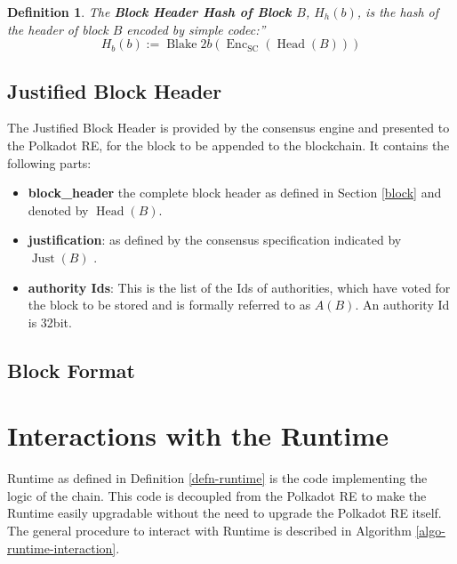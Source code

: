 \documentclass{article}
\newcommand{\assign}{:=}
\newcommand{\tmop}[1]{\ensuremath{\operatorname{#1}}}
\newcommand{\tmsamp}[1]{\textsf{#1}}
\newcommand{\tmstrong}[1]{\textbf{#1}}
\newcommand{\tmtextbf}[1]{{\bfseries{#1}}}
\newcommand{\tmtextsf}[1]{{\sffamily{#1}}}
\newtheorem{definition}{Definition}
\providecommand{\tmop}[1]{\ensuremath{\mathrm{#1}}}
\providecommand{\tmsamp}[1]{\tmtextsf{#1}}
\providecommand{\tmstrong}[1]{\tmtextbf{#1}}
\providecommand{\tmtextbf}[1]{\tmtextbf{#1}}
\newtheorem{definition}{Definition}
\begin{document}
\begin{definition}
  \label{defn-block-header-hash}The {\tmstrong{Block Header Hash of Block
  $B$}}, {\tmstrong{$H_h (b)$}}, is the hash of the header of block $B$
  encoded by simple codec:''
  \[ H_b (b) \assign \tmop{Blake} 2 b (\tmop{Enc}_{\tmop{SC}} (\tmop{Head}
     (B))) \]
\end{definition}

\subsection{Justified Block Header}

The Justified Block Header is provided by the consensus engine and presented
to the Polkadot RE, for the block to be appended to the blockchain. It
contains the following parts:
\begin{itemize}
  \item {\tmstrong{{\tmsamp{{\tmstrong{block\_header}}}}}} the complete block
  header as defined in Section \ref{block} and denoted by $\tmop{Head} (B)$.
  
  \item {\tmstrong{{\tmsamp{justification}}}}: as defined by the consensus
  specification indicated by $\tmop{Just} (B)$ {}.
  
  \item {\tmstrong{{\tmsamp{authority Ids}}}}: This is the list of the Ids of
  authorities, which have voted for the block to be stored and is formally
  referred to as $A (B)$. An authority Id is 32bit.
\end{itemize}

\subsection{Block Format}

\section{Interactions with the Runtime}\label{sect-entries-into-runtime}

Runtime as defined in Definition \ref{defn-runtime} is the code implementing
the logic of the chain. This code is decoupled from the Polkadot RE to make
the Runtime easily upgradable without the need to upgrade the Polkadot RE
itself. The general procedure to interact with Runtime is described in
Algorithm \ref{algo-runtime-interaction}.
\end{document}
